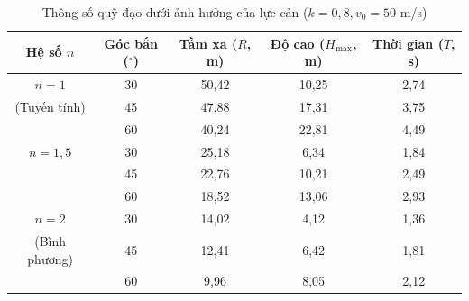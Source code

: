 \begin{table}[t]
    \centering
    \begin{tabular}{@{}ccccc@{}}
      \toprule
      \textbf{Hệ số $n$} & \textbf{Góc bắn ($^\circ$)} & \textbf{Tầm xa ($R$, m)} & \textbf{Độ cao ($H_{\max}$, m)} & \textbf{Thời gian ($T$, s)} \\ \midrule
      $n = 1$ & 30 & 50,42 & 10,25 & 2,74 \\
      (Tuyến tính) & 45 & 47,88 & 17,31 & 3,75 \\
                         & 60 & 40,24 & 22,81 & 4,49 \\ \midrule
      $n = 1,5$ & 30 & 25,18 & 6,34 & 1,84 \\
                         & 45 & 22,76 & 10,21 & 2,49 \\
                         & 60 & 18,52 & 13,06 & 2,93 \\ \midrule
      $n = 2$ & 30 & 14,02 & 4,12 & 1,36 \\
      (Bình phương) & 45 & 12,41 & 6,42 & 1,81 \\
                         & 60 & 9,96 & 8,05 & 2,12 \\ \bottomrule
    \end{tabular}
    \caption{Thông số quỹ đạo dưới ảnh hưởng của lực cản ($k=0,8, v_0=50$ m/s)}
    \label{tab:anh_huong_luc_can}
\end{table}
